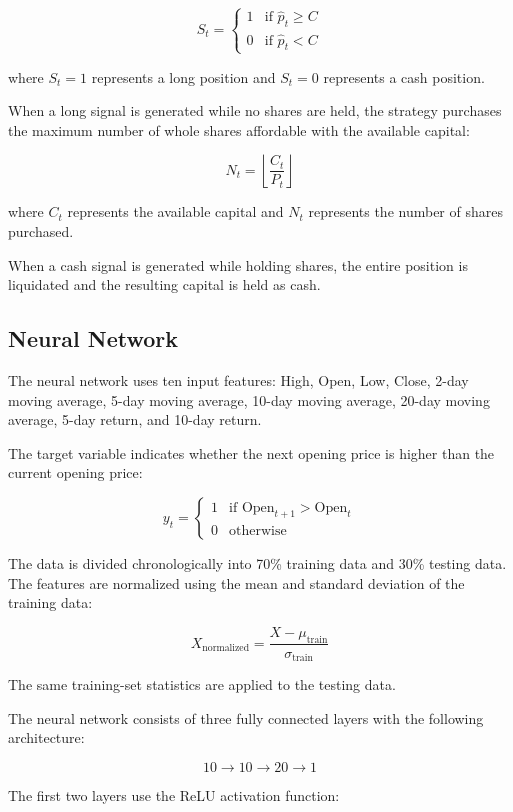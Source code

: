 \documentclass{article}
\begin{document}
\[
S_t =
\begin{cases}
1 & \text{if } \hat{p}_t \ge C \\
0 & \text{if } \hat{p}_t < C
\end{cases}
\]

where $S_t = 1$ represents a long position and $S_t = 0$ represents a cash position.

When a long signal is generated while no shares are held, the strategy purchases the maximum number of whole shares affordable with the available capital:

\[
N_t =
\left\lfloor
\frac{C_t}{P_t}
\right\rfloor
\]

where $C_t$ represents the available capital and $N_t$ represents the number of shares purchased.

When a cash signal is generated while holding shares, the entire position is liquidated and the resulting capital is held as cash.

\subsection{Neural Network}

The neural network uses ten input features: High, Open, Low, Close,
2-day moving average, 5-day moving average, 10-day moving average,
20-day moving average, 5-day return, and 10-day return.

The target variable indicates whether the next opening price is higher than the
current opening price:

\[
y_t =
\begin{cases}
1 & \text{if } \text{Open}_{t+1} > \text{Open}_t \\
0 & \text{otherwise}
\end{cases}
\]

The data is divided chronologically into 70\% training data and 30\% testing
data. The features are normalized using the mean and standard deviation of the
training data:

\[
X_{\text{normalized}}
=
\frac{X-\mu_{\text{train}}}{\sigma_{\text{train}}}
\]

The same training-set statistics are applied to the testing data.

The neural network consists of three fully connected layers with the following
architecture:

\[
10 \rightarrow 10 \rightarrow 20 \rightarrow 1
\]

The first two layers use the ReLU activation function:
\end{document}
